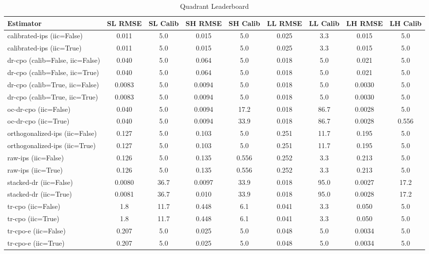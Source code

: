 \begin{table}[htbp]
\centering
\caption{Quadrant Leaderboard}
\label{tab:A1}
\begin{tabular}{l|cccccccc}
\toprule
Estimator & SL RMSE & SL Calib & SH RMSE & SH Calib & LL RMSE & LL Calib & LH RMSE & LH Calib \\
\midrule
calibrated-ips (iic=False) & 0.011 & 5.0 & 0.015 & 5.0 & 0.025 & 3.3 & 0.015 & 5.0 \\
calibrated-ips (iic=True) & 0.011 & 5.0 & 0.015 & 5.0 & 0.025 & 3.3 & 0.015 & 5.0 \\
dr-cpo (calib=False, iic=False) & 0.040 & 5.0 & 0.064 & 5.0 & 0.018 & 5.0 & 0.021 & 5.0 \\
dr-cpo (calib=False, iic=True) & 0.040 & 5.0 & 0.064 & 5.0 & 0.018 & 5.0 & 0.021 & 5.0 \\
dr-cpo (calib=True, iic=False) & 0.0083 & 5.0 & 0.0094 & 5.0 & 0.018 & 5.0 & 0.0030 & 5.0 \\
dr-cpo (calib=True, iic=True) & 0.0083 & 5.0 & 0.0094 & 5.0 & 0.018 & 5.0 & 0.0030 & 5.0 \\
oc-dr-cpo (iic=False) & 0.040 & 5.0 & 0.0094 & 17.2 & 0.018 & 86.7 & 0.0028 & 5.0 \\
oc-dr-cpo (iic=True) & 0.040 & 5.0 & 0.0094 & 33.9 & 0.018 & 86.7 & 0.0028 & 0.556 \\
orthogonalized-ips (iic=False) & 0.127 & 5.0 & 0.103 & 5.0 & 0.251 & 11.7 & 0.195 & 5.0 \\
orthogonalized-ips (iic=True) & 0.127 & 5.0 & 0.103 & 5.0 & 0.251 & 11.7 & 0.195 & 5.0 \\
raw-ips (iic=False) & 0.126 & 5.0 & 0.135 & 0.556 & 0.252 & 3.3 & 0.213 & 5.0 \\
raw-ips (iic=True) & 0.126 & 5.0 & 0.135 & 0.556 & 0.252 & 3.3 & 0.213 & 5.0 \\
stacked-dr (iic=False) & 0.0080 & 36.7 & 0.0097 & 33.9 & 0.018 & 95.0 & 0.0027 & 17.2 \\
stacked-dr (iic=True) & 0.0081 & 36.7 & 0.010 & 33.9 & 0.018 & 95.0 & 0.0028 & 17.2 \\
tr-cpo (iic=False) & 1.8 & 11.7 & 0.448 & 6.1 & 0.041 & 3.3 & 0.050 & 5.0 \\
tr-cpo (iic=True) & 1.8 & 11.7 & 0.448 & 6.1 & 0.041 & 3.3 & 0.050 & 5.0 \\
tr-cpo-e (iic=False) & 0.207 & 5.0 & 0.025 & 5.0 & 0.048 & 5.0 & 0.0034 & 5.0 \\
tr-cpo-e (iic=True) & 0.207 & 5.0 & 0.025 & 5.0 & 0.048 & 5.0 & 0.0034 & 5.0 \\
\bottomrule
\end{tabular}
\end{table}